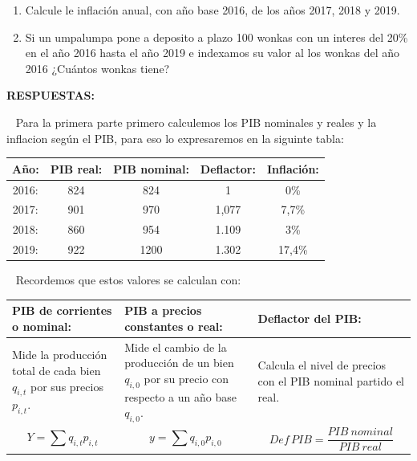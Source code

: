 \documentclass[
  letterpaper,
  DIV=11,
  numbers=noendperiod]{scrreport}
\providecommand{\tightlist}{%
  \setlength{\itemsep}{0pt}\setlength{\parskip}{0pt}}\usepackage{longtable,booktabs,array}
\begin{document}
\begin{enumerate}
\def\labelenumi{\arabic{enumi})}
\tightlist
\item
  Calcule le inflación anual, con año base 2016, de los años 2017, 2018
  y 2019.
\item
  Si un umpalumpa pone a deposito a plazo 100 wonkas con un interes del
  20\% en el año 2016 hasta el año 2019 e indexamos su valor al los
  wonkas del año 2016 ¿Cuántos wonkas tiene?
\end{enumerate}

\textbf{RESPUESTAS:}

~ Para la primera parte primero calculemos los PIB nominales y reales y
la inflacion según el PIB, para eso lo expresaremos en la siguinte
tabla:

\begin{table}[h]
    \centering
    \begin{tabular}{|c|c|c|c|c|}
    \hline
      Año: & PIB real: & PIB nominal: & Deflactor: & Inflación: \\\hline
      2016: & 824 & 824 & 1 & 0\% \\\hline
      2017: & 901 & 970 & 1,077 & 7,7\% \\\hline
      2018: & 860 & 954 & 1.109 & 3\% \\\hline
      2019: & 922 & 1200 & 1.302 & 17,4\% \\\hline
    \end{tabular}
\end{table}

~ Recordemos que estos valores se calculan con:

\begin{table}[h]
    \centering
    \begin{tabular}{|p{40mm}|p{40mm}|p{50mm}|}
        \hline
        PIB de corrientes o nominal: & PIB a precios constantes o real: & Deflactor del PIB: \\ \hline
        Mide la producción total de cada bien $q_{i,t}$ por sus precios $p_{i,t}$. & Mide el cambio de la producción de un bien $q_{i,0}$ por su precio con respecto a un año base $q_{i,0}$.  & Calcula el nivel de precios con el PIB nominal partido el real. \\ \hline
        \[Y=\sum{q_{i,t}p_{i,t}}\] & \[y=\sum{q_{i,0}p_{i,0}}\] & \[Def \, PIB =\frac{PIB\ nominal}{PIB\ real}\] \\ \hline
    \end{tabular}
    
\end{table}
\end{document}
